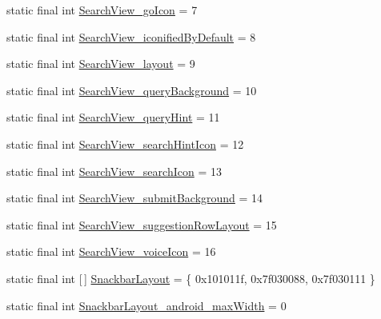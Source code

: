 \begin{DoxyCompactItemize}
\item 
static final int \mbox{\hyperlink{classandroid_1_1support_1_1design_1_1_r_1_1styleable_a5b21bc9d7e1ce7c5f2b763bf5e43cec5}{Search\+View\+\_\+go\+Icon}} = 7
\item 
static final int \mbox{\hyperlink{classandroid_1_1support_1_1design_1_1_r_1_1styleable_a7894d1db5faa7f5f12704b0ca93e87b5}{Search\+View\+\_\+iconified\+By\+Default}} = 8
\item 
static final int \mbox{\hyperlink{classandroid_1_1support_1_1design_1_1_r_1_1styleable_a8f17d3c68b24ca5d0d8a87a645cddbb8}{Search\+View\+\_\+layout}} = 9
\item 
static final int \mbox{\hyperlink{classandroid_1_1support_1_1design_1_1_r_1_1styleable_ab7e35b1ca7dacdcf1ea3b80de2fd7283}{Search\+View\+\_\+query\+Background}} = 10
\item 
static final int \mbox{\hyperlink{classandroid_1_1support_1_1design_1_1_r_1_1styleable_acc4b375bea8292a63545198b51a29d5d}{Search\+View\+\_\+query\+Hint}} = 11
\item 
static final int \mbox{\hyperlink{classandroid_1_1support_1_1design_1_1_r_1_1styleable_a0827f610b43401bd60d5813fe46f3fb8}{Search\+View\+\_\+search\+Hint\+Icon}} = 12
\item 
static final int \mbox{\hyperlink{classandroid_1_1support_1_1design_1_1_r_1_1styleable_a497935dee330894c6113c51859a9df04}{Search\+View\+\_\+search\+Icon}} = 13
\item 
static final int \mbox{\hyperlink{classandroid_1_1support_1_1design_1_1_r_1_1styleable_a9d993a18b88d403afc9c07acad19a1b1}{Search\+View\+\_\+submit\+Background}} = 14
\item 
static final int \mbox{\hyperlink{classandroid_1_1support_1_1design_1_1_r_1_1styleable_a3deb2c90b3e5b8644299a3f99b8600b8}{Search\+View\+\_\+suggestion\+Row\+Layout}} = 15
\item 
static final int \mbox{\hyperlink{classandroid_1_1support_1_1design_1_1_r_1_1styleable_ad3cd224bd53a0d7aeb792c6cc96d9c48}{Search\+View\+\_\+voice\+Icon}} = 16
\item 
static final int \mbox{[}$\,$\mbox{]} \mbox{\hyperlink{classandroid_1_1support_1_1design_1_1_r_1_1styleable_ade77d86fa8e689770b5436467abdc2db}{Snackbar\+Layout}} = \{ 0x101011f, 0x7f030088, 0x7f030111 \}
\item 
static final int \mbox{\hyperlink{classandroid_1_1support_1_1design_1_1_r_1_1styleable_ae7cafc8b9ec5f6ae9e5d5465354a0764}{Snackbar\+Layout\+\_\+android\+\_\+max\+Width}} = 0
\item 

\end{DoxyCompactItemize}
